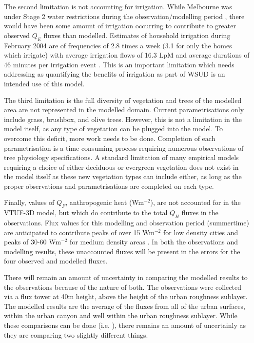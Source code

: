 \documentclass[preprint,12pt,authoryear]{elsarticle}
\begin{document}
The second limitation is not accounting for irrigation. While Melbourne was under Stage 2 water restrictions during the observation/modelling period \citep{MelbourneWater2016a}, there would have been some amount of irrigation occurring to contribute to greater observed $Q_{E}$ fluxes than modelled. Estimates of household irrigation during February 2004 are of frequencies of 2.8 times a week (3.1 for only the homes which irrigate) with average irrigation flows of 16.3 LpM and average durations of 46 minutes per irrigation event \citep{Roberts2005}. This is an important limitation which needs addressing as quantifying the benefits of irrigation as part of WSUD is an intended use of this model.

The third limitation is the full diversity of vegetation and trees of the modelled area are not represented in the modelled domain. Current parametrisations only include grass, brushbox, and olive trees. However, this is not a limitation in the model itself, as any type of vegetation can be plugged into the model. To overcome this deficit, more work needs to be done. Completion of each parametrisation is a time consuming process requiring numerous observations of tree physiology specifications. A standard limitation of many empirical models requiring a choice of either deciduous or evergreen vegetation does not exist in the model itself as these new vegetation types can include either, as long as the proper observations and parametrisations are completed on each type.


Finally, values of $Q_{F}$, anthropogenic heat (Wm$^{-2}$), are not accounted for in the VTUF-3D model, but which do contribute to the total $Q_{H}$ fluxes in the observations. Flux values for this modelling and observation period (summertime) are anticipated to contribute peaks of over 15 Wm$^{-2}$ for low density cities and peaks of 30-60 Wm$^{-2}$ for medium density areas \citep{Sailor2004}. In both the observations and modelling results, these unaccounted fluxes will be present in the errors for the four observed and modelled fluxes.

There will remain an amount of uncertainty in comparing the modelled results to the observations because of the nature of both. The observations were collected via a flux tower at 40m height, above the height of the urban roughness sublayer. The modelled results are the average of the fluxes from all of the urban surfaces, within the urban canyon and well within the urban roughness sublayer. While these comparisons can be done (i.e. \cite{Grimmond2011}), there remains an amount of uncertainly as they are comparing two slightly different things. 
\end{document}
